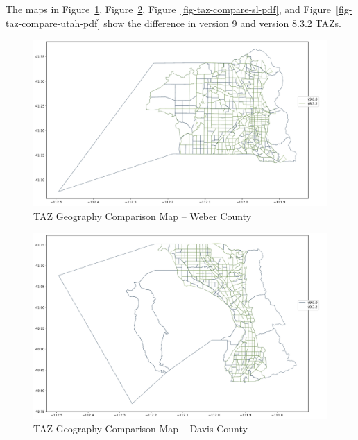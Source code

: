 \documentclass[
  letterpaper,
  DIV=11,
  numbers=noendperiod,
  titlepage=false]{scrreprt}
\begin{document}
The maps in Figure~\ref{fig-taz-compare-weber-pdf},
Figure~\ref{fig-taz-compare-davis-pdf},
Figure~\ref{fig-taz-compare-sl-pdf}, and
Figure~\ref{fig-taz-compare-utah-pdf} show the difference in version 9
and version 8.3.2 TAZs.

\begin{figure}[H]

{\centering \includegraphics{v9x/v900/whats-new/2-inputdata_files/figure-pdf/fig-taz-compare-weber-pdf-output-1.pdf}

}

\caption{\label{fig-taz-compare-weber-pdf}TAZ Geography Comparison Map
-- Weber County}

\end{figure}

\begin{figure}[H]

{\centering \includegraphics{v9x/v900/whats-new/2-inputdata_files/figure-pdf/fig-taz-compare-davis-pdf-output-1.pdf}

}

\caption{\label{fig-taz-compare-davis-pdf}TAZ Geography Comparison Map
-- Davis County}

\end{figure}
\end{document}
